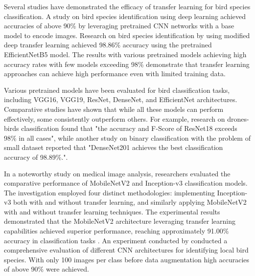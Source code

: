 \documentclass[a4paper,12pt]{report}
\begin{document}
Several studies have demonstrated the efficacy of transfer learning for bird species classification. A study on bird species identification using deep learning achieved accuracies of above 90\% by leveraging pretrained CNN networks with a base model to encode images\citep{Vo2023BirdDA}. Research on bird species identification by \citep{Mochurad2024ANE} using modified deep transfer learning achieved 98.86\% accuracy using the pretrained EfficientNetB5 model. The results with various pretrained models achieving high accuracy rates with few models exceeding 98\% demonstrate that transfer learning approaches can achieve high performance even with limited training data.

Various pretrained models have been evaluated for bird classification tasks, including VGG16, VGG19, ResNet, DenseNet, and EfficientNet architectures. Comparative studies have shown that while all these models can perform effectively, some consistently outperform others. For example, research on drones-birds classification found that "the accuracy and F-Score of ResNet18 exceeds 98\% in all cases"\citep{Mohamed2023EfficientDC}, while another study on binary classification with the problem of small dataset reported that "DenseNet201 achieves the best classification accuracy of 98.89\%."\citep{Ren2023MonkeypoxDD}.

In a noteworthy study on medical image analysis, researchers evaluated the comparative performance of MobileNetV2 and Inception-v3 classification models. The investigation employed four distinct methodologies: implementing Inception-v3 both with and without transfer learning, and similarly applying MobileNetV2 with and without transfer learning techniques. The experimental results demonstrated that the MobileNetV2 architecture leveraging transfer learning capabilities achieved superior performance, reaching approximately 91.00\% accuracy in classification tasks \citep{Rahman2020}. An experiment conducted by \citep{9402686} conducted a comprehensive evaluation of different CNN architectures for identifying local bird species. With only 100 images per class before data augmentation high accuracies of above 90\% were achieved.

\end{document}
